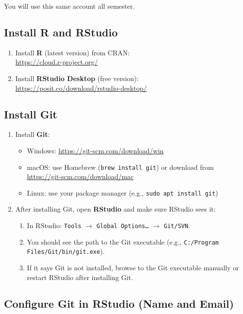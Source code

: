 \documentclass[11pt]{scrartcl}
\begin{document}
You will use this same account all semester.

\subsection{Install R and RStudio}

\begin{enumerate}[label=\arabic*., nosep]
  \item Install \textbf{R} (latest version) from CRAN:\\
  \url{https://cloud.r-project.org/}
  \item Install \textbf{RStudio Desktop} (free version):\\
  \url{https://posit.co/download/rstudio-desktop/}
\end{enumerate}

\subsection{Install Git}

\begin{enumerate}[label=\arabic*., nosep]
  \item Install \textbf{Git}:
  \begin{itemize}[nosep]
    \item Windows: \url{https://git-scm.com/download/win}
    \item macOS: use Homebrew (\verb|brew install git|) or download from \url{https://git-scm.com/download/mac}
    \item Linux: use your package manager (e.g., \verb|sudo apt install git|)
  \end{itemize}
  \item After installing Git, open \textbf{RStudio} and make sure RStudio sees it:
  \begin{enumerate}[label*=\arabic*., nosep]
    \item In RStudio: \texttt{Tools} $\rightarrow$ \texttt{Global Options\ldots} $\rightarrow$ \texttt{Git/SVN}.
    \item You should see the path to the Git executable (e.g., \texttt{C:/Program Files/Git/bin/git.exe}).
    \item If it says Git is not installed, browse to the Git executable manually or restart RStudio after installing Git.
  \end{enumerate}
\end{enumerate}

\subsection{Configure Git in RStudio (Name and Email)}
\end{document}
